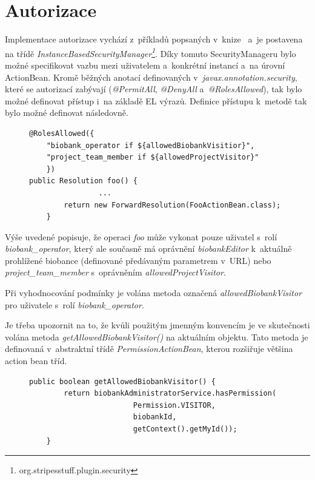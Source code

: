 \documentclass[11pt, draft, oneside]{fithesis2}
\begin{document}
\section{Autorizace}
Implementace autorizace vychází z~příkladů popsaných v~knize~\cite{Stripes} a~je postavena na třídě \textit{InstanceBasedSecurityManager\footnote{org.stripesstuff.plugin.security}}. Díky tomuto SecurityManageru bylo možné specifikovat vazbu mezi uživatelem a~konkrétní instancí a~na úrovní ActionBean. Kromě běžných anotací definovaných v~\textit{javax.annotation.security}, které se autorizací zabývají (\textit{@PermitAll}, \textit{@DenyAll} a~\textit{@RolesAllowed}), tak bylo možné definovat přístup i~na základě EL výrazů. Definice přístupu k~metodě tak bylo možné definovat následovně.

\begin{figure}[h!]
\begin{center}
\begin{lstlisting}[mathescape=false]
@RolesAllowed({
	"biobank_operator if ${allowedBiobankVisitior}", 
	"project_team_member if ${allowedProjectVisitor}"
	})
public Resolution foo() { 
				...
        return new ForwardResolution(FooActionBean.class);
    }
\end{lstlisting}
\end{center}
\end{figure}

Výše uvedené popisuje, že operaci \textit{foo} může vykonat pouze uživatel s~rolí \textit{biobank\_operator}, který ale současně má oprávnění \textit{biobankEditor} k~aktuálně prohlížené biobance (definované předávaným parametrem v~URL) nebo \textit{project\_team\_member} s~oprávněním \textit{allowedProjectVisitor}.

Při vyhodnocování podmínky je volána metoda označená \textit{allowedBiobankVisitor} pro uživatele s~rolí \textit{biobank\_operator}. 

Je třeba upozornit na to, že kvůli použitým jmenným konvencím je ve skutečnosti volána metoda \textit{getAllowedBiobankVisitor()} na aktuálním objektu. Tato metoda je definovaná v~abstraktní třídě \textit{PermissionActionBean}, kterou rozšiřuje většina action bean tříd.

\begin{figure}[h!]
\begin{center}
\begin{lstlisting}[mathescape=false]
public boolean getAllowedBiobankVisitor() {
        return biobankAdministratorService.hasPermission(
						Permission.VISITOR, 
						biobankId, 
						getContext().getMyId());
    }
\end{lstlisting}
\end{center}
\end{figure}
\end{document}
